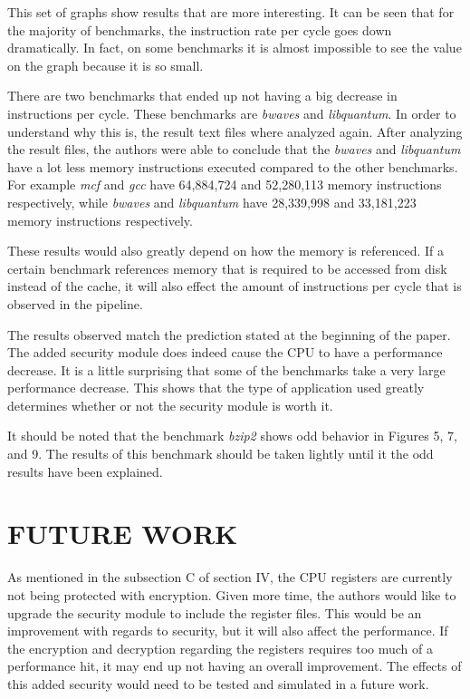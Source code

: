 \documentclass[letterpaper, 10pt, conference]{ieeeconf}  %
\begin{document}
This set of graphs show results that are more interesting.  It can be seen that for the majority of benchmarks, the instruction rate per cycle goes down dramatically.  In fact, on some benchmarks it is almost impossible to see the value on the graph because it is so small.

There are two benchmarks that ended up not having a big decrease in instructions per cycle.  These benchmarks are \emph{bwaves} and \emph{libquantum}.  In order to understand why this is, the result text files where analyzed again.  After analyzing the result files, the authors were able to conclude that the \emph{bwaves} and \emph{libquantum} have a lot less memory instructions executed compared to the other benchmarks.  For example \emph{mcf} and \emph{gcc} have 64,884,724 and 52,280,113 memory instructions respectively, while \emph{bwaves} and \emph{libquantum} have 28,339,998 and 33,181,223 memory instructions respectively.

These results would also greatly depend on how the memory is referenced.  If a certain benchmark references memory that is required to be accessed from disk instead of the cache, it will also effect the amount of instructions per cycle that is observed in the pipeline.

The results observed match the prediction stated at the beginning of the paper.  The added security module does indeed cause the CPU to have a performance decrease.  It is a little surprising that some of the benchmarks take a very large performance decrease.  This shows that the type of application used greatly determines whether or not the security module is worth it.

It should be noted that the benchmark \emph{bzip2} shows odd behavior in Figures 5, 7, and 9.  The results of this benchmark should be taken lightly until it the odd results have been explained.


\section{FUTURE WORK}

As mentioned in the subsection C of section IV, the CPU registers are currently not being protected with encryption.  Given more time, the authors would like to upgrade the security module to include the register files.  This would be an improvement with regards to security, but it will also affect the performance.  If the encryption and decryption regarding the registers requires too much of a performance hit, it may end up not having an overall improvement.  The  effects of this added security would need to be tested and simulated in a future work.
\end{document}
